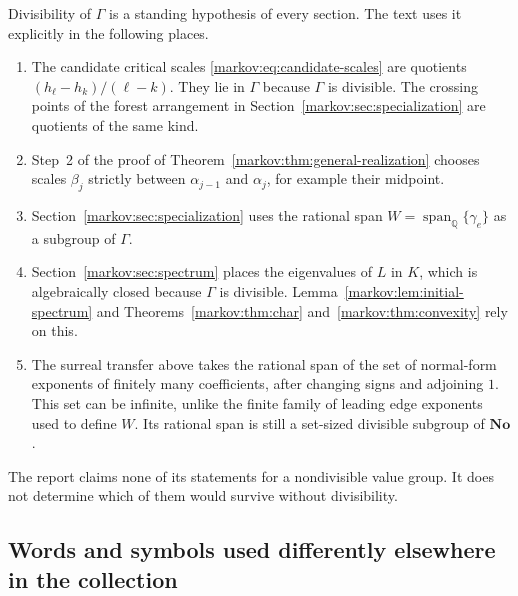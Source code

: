 \documentclass[11pt]{article}
\numberwithin{equation}{section}
\theoremstyle{definition}
\theoremstyle{remark}
\newcommand{\Q}{\mathbb Q}
\newcommand{\No}{\mathbf{No}}
\newcommand{\Span}{\operatorname{span}}
\begin{document}
Divisibility of $\Gamma$ is a standing hypothesis of every section. The text
uses it explicitly in the following places.
\begin{enumerate}[label=(D\arabic*),leftmargin=3.2em]
\item The candidate critical scales \eqref{markov:eq:candidate-scales} are
quotients $(h_\ell-h_k)/(\ell-k)$. They lie in $\Gamma$ because $\Gamma$ is
divisible. The crossing points of the forest arrangement in
Section~\ref{markov:sec:specialization} are quotients of the same kind.
\item Step~2 of the proof of Theorem~\ref{markov:thm:general-realization} chooses
scales $\beta_j$ strictly between $\alpha_{j-1}$ and $\alpha_j$, for example
their midpoint.
\item\label{markov:item:div-span} Section~\ref{markov:sec:specialization} uses
the rational span $W=\Span_\Q\{\gamma_e\}$ as a subgroup of $\Gamma$.
\item Section~\ref{markov:sec:spectrum} places the eigenvalues of $L$ in $K$,
which is algebraically closed because $\Gamma$ is divisible.
Lemma~\ref{markov:lem:initial-spectrum} and Theorems~\ref{markov:thm:char}
and~\ref{markov:thm:convexity} rely on this.
\item The surreal transfer above takes the rational span of the set of
normal-form exponents of finitely many coefficients, after changing signs and
adjoining $1$. This set can be infinite, unlike the finite family of leading
edge exponents used to define $W$. Its rational span is still a set-sized
divisible subgroup of $\No$.
\end{enumerate}
The report claims none of its statements for a nondivisible value group. It
does not determine which of them would survive without divisibility.

\subsection{Words and symbols used differently elsewhere in the collection}
\label{markov:sec:words}
\end{document}
